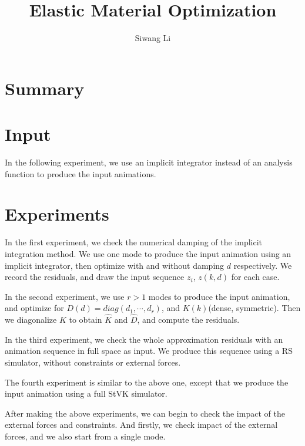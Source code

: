 \documentclass[twocolumn,a4paper]{article}
\author{Siwang Li}
\title{Elastic Material Optimization}
\begin{document}
\maketitle

\section{Summary}


\section{Input} 
In the following experiment, we use an implicit integrator instead of an
analysis function to produce the input animations.

\section{Experiments}
In the first experiment, we check the numerical damping of the implicit
integration method. We use one mode to produce the input animation using an
implicit integrator, then optimize with and without damping $d$ respectively. We
record the residuals, and draw the input sequence $z_i$, $z(k,d)$ for each case.

In the second experiment, we use $r>1$ modes to produce the input animation, and
optimize for $D(d)=diag(d_1,\cdots,d_r)$, and $K(k)$(dense, symmetric). Then we
diagonalize $K$ to obtain $\hat{K}$ and $\hat{D}$, and compute the residuals.

In the third experiment, we check the whole approximation residuals with an
animation sequence in full space as input. We produce this sequence using a RS
simulator, without constraints or external forces.

The fourth experiment is similar to the above one, except that we produce the
input animation using a full StVK simulator.

After making the above experiments, we can begin to check the impact of the
external forces and constraints. And firstly, we check impact of the external
forces, and we also start from a single mode.
\end{document}
